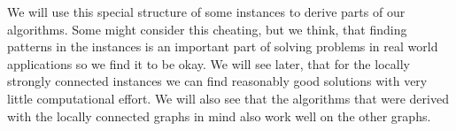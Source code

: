 We will use this special structure of some instances to derive parts of our algorithms. Some might consider 
this cheating, but we think, that finding patterns in the instances is an important part of solving problems 
in real world applications so we find it to be okay. We will see later, that for the locally strongly connected 
instances we can find reasonably good solutions with very little computational effort. We will also see that 
the algorithms that were derived with the locally connected graphs in mind also work well on the other graphs.\\



\pagebreak

